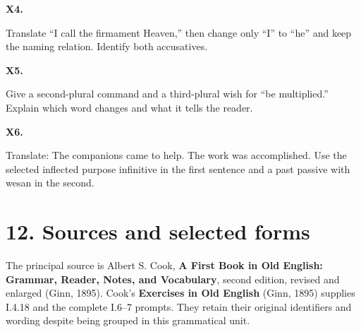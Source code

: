 \par\begin{minipage}{\linewidth}\raggedright
\textbf{X4.}

Translate “I call the firmament Heaven,” then change only “I” to “he” and keep the naming relation. Identify both accusatives.

\end{minipage}\par\addvspace{4pt}

\par\begin{minipage}{\linewidth}\raggedright
\textbf{X5.}

Give a second-plural command and a third-plural wish for “be multiplied.” Explain which word changes and what it tells the reader.

\end{minipage}\par\addvspace{4pt}

\par\begin{minipage}{\linewidth}\raggedright
\textbf{X6.}

Translate: The companions came to help. The work was accomplished. Use the selected inflected purpose infinitive in the first sentence and a past passive with wesan in the second.

\end{minipage}\par\addvspace{4pt}

\clearpage
\section*{12. Sources and selected forms}

\begingroup\fontsize{10}{12.8}\selectfont
\setlength{\parskip}{1.5pt}
The principal source is Albert S. Cook, \textbf{A First Book in Old English: Grammar, Reader, Notes, and Vocabulary}, second edition, revised and enlarged (Ginn, 1895). Cook’s \textbf{Exercises in Old English} (Ginn, 1895) supplies I.4.18 and the complete I.6–7 prompts. They retain their original identifiers and wording despite being grouped in this grammatical unit.

